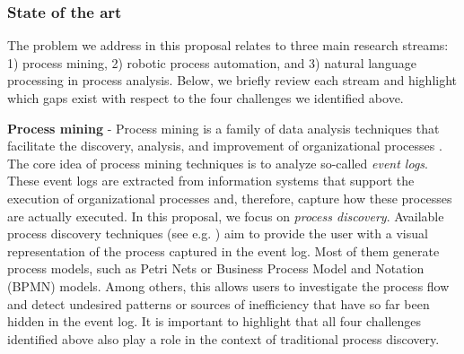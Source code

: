  \subsubsection{State of the art}
 
The problem we address in this proposal relates to three main research streams: 1) process mining, 2) robotic process automation, and 3) natural language processing in process analysis. Below, we briefly review each stream and highlight which gaps exist with respect to the four challenges we identified above.  

\textbf{Process mining} - Process mining is a family of data analysis techniques that facilitate the discovery, analysis, and improvement of organizational processes \cite{van2016data}. The core idea of process mining techniques is to analyze so-called \textit{event logs}. These event logs are extracted from information systems that support the execution of organizational processes and, therefore, capture how these processes are actually executed. In this proposal, we focus on \textit{process discovery}. Available process discovery techniques (see e.g. \cite{gunther2007fuzzy,weijters2011flexible,leemans2013discovering}) aim to provide the user with a visual representation of the process captured in the event log. Most of them generate process models, such as Petri Nets or Business Process Model and Notation (BPMN) models. Among others, this allows users to investigate the process flow and detect undesired patterns or sources of inefficiency that have so far been hidden in the event log. It is important to highlight that all four challenges identified above also play a role in the context of traditional process discovery. 

